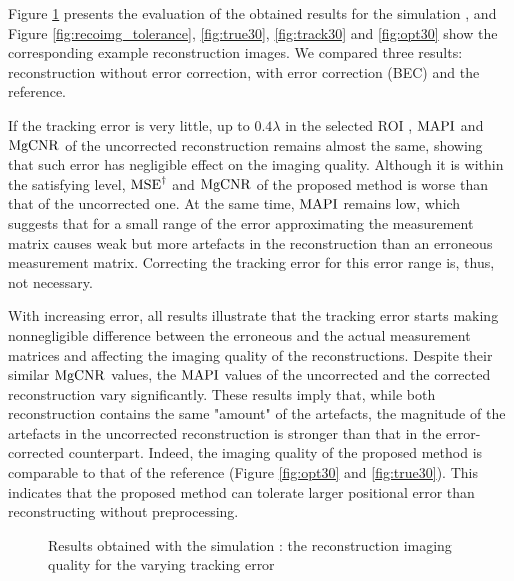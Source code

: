 Figure \ref{fig:results_tolerance} presents the evaluation of the obtained results for the simulation , and Figure \ref{fig:recoimg_tolerance}, \ref{fig:true30}, \ref{fig:track30} and \ref{fig:opt30} show the corresponding example reconstruction images. We compared three results: reconstruction without error correction, with error correction (BEC) and the reference. \par

If the tracking error is very little, up to $0.4 \lambda$ in the selected ROI , $\operatorname{MAPI}$ and $\operatorname{MgCNR}$ of the uncorrected reconstruction remains almost the same, showing that such error has negligible effect on the imaging quality. Although it is within the satisfying level, $\operatorname{MSE}^{\dagger}$ and $\operatorname{MgCNR}$ of the proposed method is worse than that of the uncorrected one. At the same time, $\operatorname{MAPI}$ remains low, which suggests that for a small range of the error approximating the measurement matrix causes weak but more artefacts in the reconstruction than an erroneous measurement matrix. Correcting the tracking error for this error range is, thus, not necessary. \par

With increasing error, all results illustrate that the tracking error starts making nonnegligible difference between the erroneous and the actual measurement matrices and affecting the imaging quality of the reconstructions. Despite their similar $\operatorname{MgCNR}$ values, the $\operatorname{MAPI}$ values of the uncorrected and the corrected reconstruction vary significantly. These results imply that, while both reconstruction contains the same "amount" of the artefacts, the magnitude of the artefacts in the uncorrected reconstruction is stronger than that in the error-corrected counterpart. Indeed, the imaging quality of the proposed method is comparable to that of the reference (Figure \ref{fig:opt30} and \ref{fig:true30}). This indicates that the proposed method can tolerate larger positional error than reconstructing without preprocessing.  \par

\begin{figure}

\setlength{\abovecaptionskip}{-5pt} %
\caption{Results obtained with the simulation : the reconstruction imaging quality for the varying tracking error}
\label{fig:results_tolerance}
\setlength{\belowcaptionskip}{-20pt} %
\end{figure}

